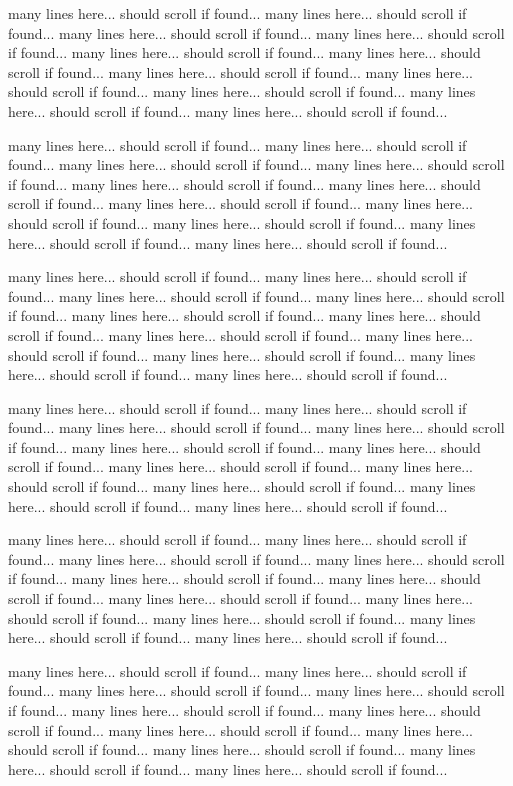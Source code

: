 {{{{many lines here... should scroll if found...
many lines here... should scroll if found...
many lines here... should scroll if found...
many lines here... should scroll if found...
many lines here... should scroll if found...
many lines here... should scroll if found...
many lines here... should scroll if found...
many lines here... should scroll if found...
many lines here... should scroll if found...
many lines here... should scroll if found...
many lines here... should scroll if found...

many lines here... should scroll if found...
many lines here... should scroll if found...
many lines here... should scroll if found...
many lines here... should scroll if found...
many lines here... should scroll if found...
many lines here... should scroll if found...
many lines here... should scroll if found...
many lines here... should scroll if found...
many lines here... should scroll if found...
many lines here... should scroll if found...
many lines here... should scroll if found...

many lines here... should scroll if found...
many lines here... should scroll if found...
many lines here... should scroll if found...
many lines here... should scroll if found...
many lines here... should scroll if found...
many lines here... should scroll if found...
many lines here... should scroll if found...
many lines here... should scroll if found...
many lines here... should scroll if found...
many lines here... should scroll if found...
many lines here... should scroll if found...

many lines here... should scroll if found...
many lines here... should scroll if found...
many lines here... should scroll if found...
many lines here... should scroll if found...
many lines here... should scroll if found...
many lines here... should scroll if found...
many lines here... should scroll if found...
many lines here... should scroll if found...
many lines here... should scroll if found...
many lines here... should scroll if found...
many lines here... should scroll if found...

many lines here... should scroll if found...
many lines here... should scroll if found...
many lines here... should scroll if found...
many lines here... should scroll if found...
many lines here... should scroll if found...
many lines here... should scroll if found...
many lines here... should scroll if found...
many lines here... should scroll if found...
many lines here... should scroll if found...
many lines here... should scroll if found...
many lines here... should scroll if found...

many lines here... should scroll if found...
many lines here... should scroll if found...
many lines here... should scroll if found...
many lines here... should scroll if found...
many lines here... should scroll if found...
many lines here... should scroll if found...
many lines here... should scroll if found...
many lines here... should scroll if found...
many lines here... should scroll if found...
many lines here... should scroll if found...
many lines here... should scroll if found...

%
$$
{}}
}}}
